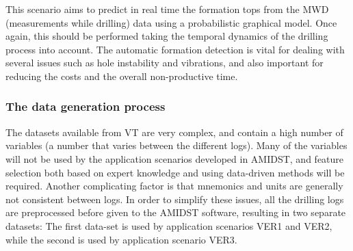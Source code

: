 \item[Automatic formation detection:]
This scenario aims to predict in real time the formation tops from the MWD 
(measurements while drilling) data using a probabilistic graphical model. Once again, this should be performed taking the temporal
dynamics of the drilling process into account. The automatic formation detection
is vital for dealing with several issues such as hole instability and vibrations, and
also important for reducing the costs and the overall non-productive time. 
\ede




\subsubsection{The data generation process} \label{sec:VT:Dataset:1}


The datasets available from VT are very complex, and contain a high number of variables (a  number that varies between the different logs). 
Many of the variables  will not be used by  the application scenarios developed in AMIDST, and feature selection both based on expert knowledge and using data-driven methods will be required. 
Another complicating factor is that mnemonics and units are generally not consistent between logs.  
In order to simplify these issues, all the drilling logs are preprocessed before given to the AMIDST software, resulting in two separate datasets:  
The first data-set is used by application scenarios VER1 and VER2, while the second is used by application scenario VER3.

